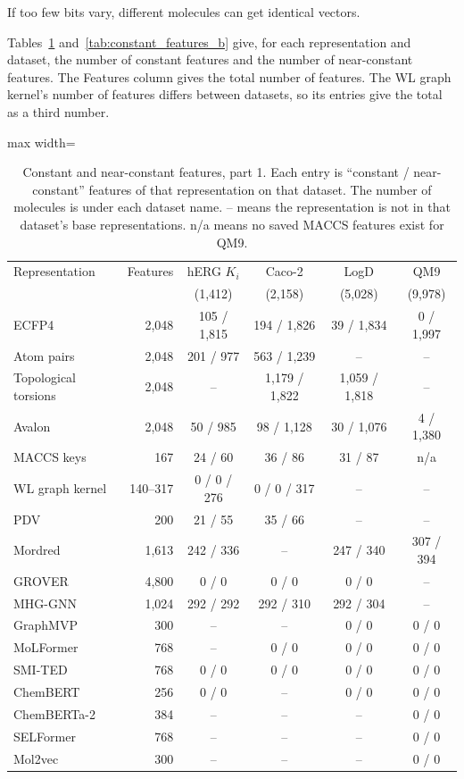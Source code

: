 If too few bits vary, different molecules can get identical vectors.

Tables~\ref{tab:constant_features} and~\ref{tab:constant_features_b} give, for each representation and dataset, the number of constant features and the number of near-constant features. The Features column gives the total number of features. The WL graph kernel's number of features differs between datasets, so its entries give the total as a third number.

\begin{table}[htbp]
\centering
\small
\setlength{\tabcolsep}{4pt}
\caption[Constant and near-constant features, part 1.]{Constant and near-constant features, part 1. Each entry is ``constant / near-constant'' features of that representation on that dataset. The number of molecules is under each dataset name. -- means the representation is not in that dataset's base representations. n/a means no saved MACCS features exist for QM9.}
\label{tab:constant_features}
\begin{adjustbox}{max width=\textwidth}
\begin{tabular}{lrcccc}
\toprule
Representation & Features & hERG $K_i$ & Caco-2 & LogD & QM9 \\
 & & (1,412) & (2,158) & (5,028) & (9,978) \\
\midrule
ECFP4 & 2,048 & 105 / 1,815 & 194 / 1,826 & 39 / 1,834 & 0 / 1,997 \\
Atom pairs & 2,048 & 201 / 977 & 563 / 1,239 & -- & -- \\
Topological torsions & 2,048 & -- & 1,179 / 1,822 & 1,059 / 1,818 & -- \\
Avalon & 2,048 & 50 / 985 & 98 / 1,128 & 30 / 1,076 & 4 / 1,380 \\
MACCS keys & 167 & 24 / 60 & 36 / 86 & 31 / 87 & n/a \\
WL graph kernel & 140--317 & 0 / 0 / 276 & 0 / 0 / 317 & -- & -- \\
PDV & 200 & 21 / 55 & 35 / 66 & -- & -- \\
Mordred & 1,613 & 242 / 336 & -- & 247 / 340 & 307 / 394 \\
GROVER & 4,800 & 0 / 0 & 0 / 0 & 0 / 0 & -- \\
MHG-GNN & 1,024 & 292 / 292 & 292 / 310 & 292 / 304 & -- \\
GraphMVP & 300 & -- & -- & 0 / 0 & 0 / 0 \\
MoLFormer & 768 & -- & 0 / 0 & 0 / 0 & 0 / 0 \\
SMI-TED & 768 & 0 / 0 & 0 / 0 & 0 / 0 & 0 / 0 \\
ChemBERT & 256 & 0 / 0 & -- & 0 / 0 & 0 / 0 \\
ChemBERTa-2 & 384 & -- & -- & -- & 0 / 0 \\
SELFormer & 768 & -- & -- & -- & 0 / 0 \\
Mol2vec & 300 & -- & -- & -- & 0 / 0 \\
\bottomrule
\end{tabular}
\end{adjustbox}
\end{table}

